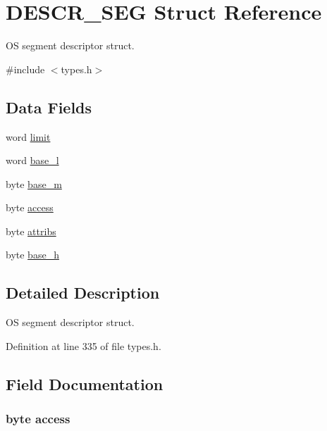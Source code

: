 \hypertarget{struct_d_e_s_c_r___s_e_g}{
\section{DESCR\_\-SEG Struct Reference}
\label{struct_d_e_s_c_r___s_e_g}
}


OS segment descriptor struct.  




{\ttfamily \#include $<$types.h$>$}

\subsection*{Data Fields}
\begin{DoxyCompactItemize}
\item 
word \hyperlink{struct_d_e_s_c_r___s_e_g_ab5c3c0a36eb16002f03ae8565e505e89}{limit}
\item 
word \hyperlink{struct_d_e_s_c_r___s_e_g_a224f2e6e6450f9962b95fdb072f418b3}{base\_\-l}
\item 
byte \hyperlink{struct_d_e_s_c_r___s_e_g_a5c4cfa8b9f24cf1ee0523cdc8ee7cbe3}{base\_\-m}
\item 
byte \hyperlink{struct_d_e_s_c_r___s_e_g_a7a3205f563ba31a30efd817ea54561fd}{access}
\item 
byte \hyperlink{struct_d_e_s_c_r___s_e_g_addb2c00f31ab98af1ca1d6c8190059ac}{attribs}
\item 
byte \hyperlink{struct_d_e_s_c_r___s_e_g_a65dd6766eb6584c25d200c8cb88bac0d}{base\_\-h}
\end{DoxyCompactItemize}


\subsection{Detailed Description}
OS segment descriptor struct. 

Definition at line 335 of file types.h.



\subsection{Field Documentation}
\hypertarget{struct_d_e_s_c_r___s_e_g_a7a3205f563ba31a30efd817ea54561fd}{
\subsubsection[{access}]{\setlength{\rightskip}{0pt plus 5cm}byte {\bf access}}}
\label{struct_d_e_s_c_r___s_e_g_a7a3205f563ba31a30efd817ea54561fd}


